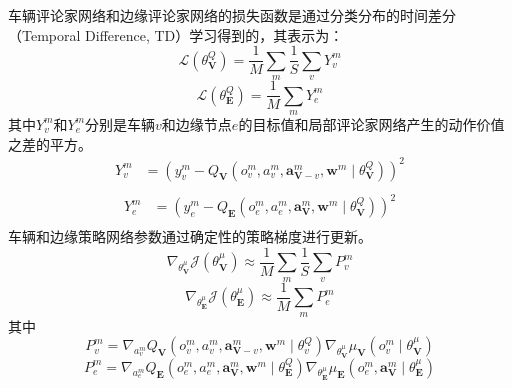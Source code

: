 车辆评论家网络和边缘评论家网络的损失函数是通过分类分布的时间差分（Temporal Difference, TD）学习得到的，其表示为：
\begin{equation}
	\mathcal{L}\left(\theta_{\mathbf{V}}^{Q}\right)=\frac{1}{M} \sum_{m} \frac{1}{S} \sum_{v} {Y_v^{m}}
\end{equation}
\begin{equation}
	\mathcal{L}\left(\theta_{\mathbf{E}}^{Q}\right)=\frac{1}{M} \sum_{m} {Y_e^{m}}
\end{equation}
\noindent 其中$Y_v^{m}$和$Y_e^{m}$分别是车辆$v$和边缘节点$e$的目标值和局部评论家网络产生的动作价值之差的平方。
\begin{equation}
	\begin{aligned}
		Y_v^{m} &= \left(y_{v}^{m}-Q_{\mathbf{V}}\left({o}_{v}^{m},  {a}_{v}^{m}, \boldsymbol{a}_{\boldsymbol{\mathbf{V}}-v}^{m}, \boldsymbol{w}^{m} \mid \theta_{\mathbf{V}}^{Q} \right)\right)^{2} \\
	\end{aligned}
\end{equation}
\begin{equation}
	\begin{aligned}
		Y_e^{m} &=\left(y_{e}^{m}-Q_{\mathbf{E}}\left({o}_{e}^{m},  {a}_{e}^{m}, \boldsymbol{a}_{\boldsymbol{\mathbf{V}}}^{m}, \boldsymbol{w}^{m} \mid \theta_{\mathbf{V}}^{Q} \right)\right)^{2} \\
	\end{aligned}
\end{equation}
车辆和边缘策略网络参数通过确定性的策略梯度进行更新。
\begin{equation}
	\nabla_{\theta_{\mathbf{V}}^{\mu}} \mathcal{J} (\theta_{\mathbf{V}}^{\mu}) \approx \frac{1}{M} \sum_{m} \frac{1}{S} \sum_{v} P_{v}^{m} 
\end{equation}
\begin{equation}
	\nabla_{\theta_{\mathbf{E}}^{\mu}} \mathcal{J} (\theta_{\mathbf{E}}^{\mu}) \approx \frac{1}{M} \sum_{m} P_{e}^{m} 
\end{equation}
\noindent 其中 
\begin{equation}
P_{v}^{m} = \nabla_{{a}_{v}^{m}} Q_{\mathbf{V}}\left({o}_{v}^{m}, {a}_{v}^{m}, \boldsymbol{a}_{\boldsymbol{\mathbf{V}}-v}^{m}, \boldsymbol{w}^{m} \mid \theta_{v}^{Q} \right) \nabla_{\theta_{\mathbf{V}}^{\mu}} \mu_{\mathbf{V}}\left({o}_{v}^{m} \mid \theta_{\mathbf{V}}^{\mu}\right)
\end{equation}
\begin{equation}
P_{e}^{m} = \nabla_{{a}_{e}^{m}} Q_{\mathbf{E}}\left({o}_{e}^{m}, {a}_{e}^{m}, \boldsymbol{a}_{\boldsymbol{\mathbf{V}}}^{m}, \boldsymbol{w}^{m} \mid \theta_{\mathbf{E}}^{Q} \right) \nabla_{\theta_{\mathbf{E}}^{\mu}} \mu_{\mathbf{E}}\left({o}_{e}^{m}, {\boldsymbol{a}}_{\boldsymbol{\mathbf{V}}}^{m} \mid \theta_{\mathbf{E}}^{\mu}\right)
\end{equation}

